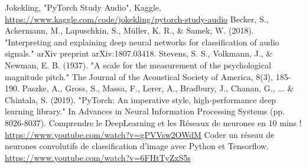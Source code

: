 \begin{thebibliography}{9}
     Jokekling, "PyTorch Study Audio", Kaggle, \url{https://www.kaggle.com/code/jokekling/pytorch-study-audio}
     Becker, S., Ackermann, M., Lapuschkin, S., Müller, K. R., \& Samek, W. (2018). "Interpreting and explaining deep neural networks for classification of audio signals." arXiv preprint arXiv:1807.03418.
     Stevens, S. S., Volkmann, J., \& Newman, E. B. (1937). "A scale for the measurement of the psychological magnitude pitch." The Journal of the Acoustical Society of America, 8(3), 185-190.
     Paszke, A., Gross, S., Massa, F., Lerer, A., Bradbury, J., Chanan, G., ... \& Chintala, S. (2019). "PyTorch: An imperative style, high-performance deep learning library." In Advances in Neural Information Processing Systems (pp. 8026-8037).
     Comprendre le DeepLearning et les Réseaux de neurones en 10 mins ! \url{https://www.youtube.com/watch?v=gPVVsw2OWdM}
     Coder un réseau de neurones convolutifs de classification d'image avec Python et Tensorflow. \url{https://www.youtube.com/watch?v=6FHtTyZxS5s}
\end{thebibliography}